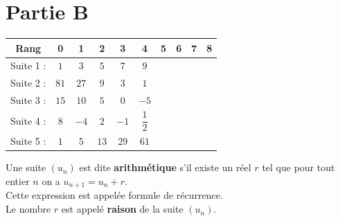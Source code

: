 \documentclass[a4paper,11pt,exos]{nsi} %
\begin{document}
\maketitle
\section*{Partie B}


\renewcommand{\arraystretch}{1.6}
\begin{tabular}{|c|c|c|c|c|c|c|c|c|c|}
	\hline
	\rowcolor{UGLiOrange}Rang & \hspace{0.5cm}0\hspace{0.5cm} & \hspace{0.5cm}1\hspace{0.5cm} & \hspace{0.5cm}2\hspace{0.5cm} & \hspace{0.5cm}3\hspace{0.5cm} & \hspace{0.5cm}4\hspace{0.5cm} & \hspace{0.5cm}5\hspace{0.5cm} & \hspace{0.5cm}6\hspace{0.5cm} & \hspace{0.5cm}7\hspace{0.5cm} & \hspace{0.5cm}8\hspace{0.5cm}  \\
	\hline
	\cellcolor{UGLiOrange}Suite 1 : & $1$ & $3$ & $5$ & $7$ & $9$ & & & & \\
	\hline
	\cellcolor{UGLiOrange}Suite 2 : & $81$ & $27$ & $9$ & $3$ & $1$ & & & & \\
	\hline
	\cellcolor{UGLiOrange}Suite 3 : & $15$ & $10$ & $5$ & $0$ & $-5$ & & & & \\
	\hline
	\cellcolor{UGLiOrange}Suite 4 : & $8$ & $-4$ & $2$ & $-1$ & $\dfrac{1}{2}$ & & & & \\
	\hline
	\cellcolor{UGLiOrange}Suite 5 : & $1$ & $5$ & $13$ & $29$ & $61$ & & & & \\
	\hline
\end{tabular}


\begin{definition}[]
	Une suite $(u_n)$ est dite \textbf{arithmétique} s'il existe un réel $r$ tel que pour tout entier $n$ on a  $u_{n+1}=u_n+r$.\\
	Cette expression est appelée formule de récurrence.\\
	Le nombre $r$ est appelé \textbf{raison} de la suite $(u_n)$.
\end{definition}
\end{document}
